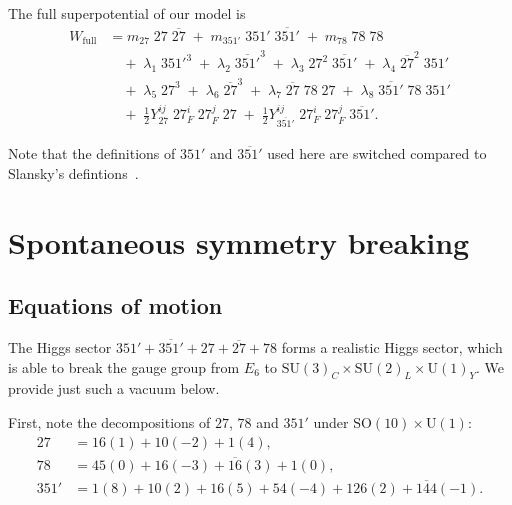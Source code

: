 \documentclass[a4paper,12pt]{article}
\def\yd{Y_{27}}
\def\yt{Y_{\overline{351'}}}
\def\SU{\mathrm{SU}}
\def\SO{\mathrm{SO}}
\begin{document}
The full superpotential of our model is
\begin{align}
W_{\textrm{full}}&=m_{27}\; 27\;\overline{27}\;+\;m_{351'}\;351'\;\overline{351'}\nonumber \;+\; m_{78}\;78\;78\\
&\quad+\; \lambda_1\; 351'^3 \;+\; \lambda_2\;\overline{351'}^3 \;+\; \lambda_3\;27^2\;\overline{351'} \;+\; \lambda_4\; \overline{27}^2\;351'\nonumber\\
&\quad+\; \lambda_5\;27^3 \;+\; \lambda_6\;\overline{27}^3 \;+\; \lambda_7\;\overline{27}\;78\;27 \;+\; \lambda_8\;\overline{351'}{}\;78\;351'\nonumber \\
&\quad+\; \tfrac{1}{2}\yd^{ij}\;27_F^i\;27^j_F\;27 \;+\; \tfrac{1}{2}\yt^{ij}\;27_F^i\;27^j_F\;\overline{351'}.\label{equation:W-full}
\end{align}

\noindent
Note that the definitions of $351'$ and $\overline{351'}$  used here are switched compared to Slansky's defintions~\cite{Slansky:1981yr}.


\section{Spontaneous symmetry breaking\label{section:SSB}}
\subsection{Equations of motion}

The Higgs sector $351'+\overline{351'}+27+\overline{27}+78$ forms a realistic Higgs sector, which is able to break the gauge group from $E_6$ to $\SU(3)_C\times\SU(2)_L\times\mathrm{U}(1)_Y$. We provide just such a vacuum below.

First, note the decompositions of $27$, $78$ and $351'$ under $\SO(10)\times \mathrm{U}(1)$:
\begin{align}
27&=16(1)+10(-2)+1(4),\\
78&=45(0)+16(-3)+\overline{16}(3)+1(0),\\
351'&=1(8)+10(2)+16(5)+54(-4)+126(2)+\overline{144}(-1).
\end{align}
\end{document}
